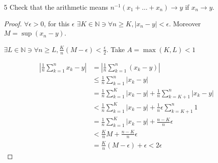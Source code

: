 \documentclass{article}
\newcommand{\N}{\mathbb{N}}
\newcommand{\abs}[1]{\left\lvert #1\right\rvert}
\begin{document}
\begin{PROB}{5}\label{Problem 5.}
    Check that the arithmetic means $n^{-1}(x_1 + \dots + x_{n}) \to y$ if $x_n \to y$.   
\end{PROB}
\begin{proof}
    $\forall \epsilon > 0$, for this $\epsilon$ $\exists K \in \N \ni \forall n \geq K, \abs{x_n - y} < \epsilon$. Moreover $M = \sup(x_n - y)$.    
    
    $\exists L \in \N \ni \forall n \geq L, \frac{K}{n}(M - \epsilon) < \frac{\epsilon}{2}$. Take $A = \max(K, L) < 1$     

    \begin{align*}
        \abs{\frac{1}{n}\sum_{k = 1}^{n} x_k - y} &= \abs{\frac{1}{n}\sum_{k = 1}^{n}\left(x_k - y\right)} \\
        &\leq \frac{1}{n}\sum_{k = 1}^{n}\abs{x_k - y} \\
        &= \frac{1}{n}\sum_{k = 1}^{K}\abs{x_k - y} + \frac{1}{n} \sum_{k = K + 1}^{n}\abs{x_k - y} \\
        &< \frac{1}{n}\sum_{k = 1}^{K}\abs{x_k - y} + \frac{1}{n}\epsilon \sum_{k = K + 1}^{n} 1\\
        &= \frac{1}{n}\sum_{k = 1}^{K}\abs{x_k - y} + \frac{n - K}{n} \epsilon \\ 
        &< \frac{K}{n}M + \frac{n - K}{n}\epsilon \\
        &= \frac{K}{n}(M - \epsilon) + \epsilon < 2\epsilon
    \end{align*}
\end{proof}
\end{document}

